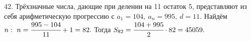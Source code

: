42. Трёхзначные числа, дающие при делении на 11 остаток 5, представляют из себя арифметическую прогрессию с $a_1=104,\ a_n=995,\ d=11.$ Найдём $n:\ n=\cfrac{995-104}{11}+1=82.$ Тогда $S_{82}=\cfrac{104+995}{2}\cdot82=45059.$\\
